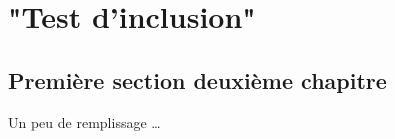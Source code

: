 \chapter{"Test d'inclusion"}
\section{Premi\`ere section deuxi\`eme chapitre}
Un peu de remplissage \newline
\dots

